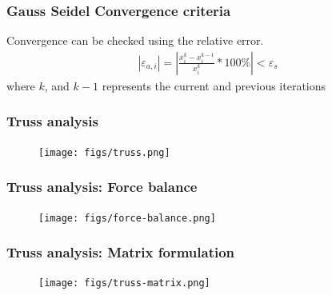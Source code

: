\documentclass[notes]{beamer}
\begin{document}
\begin{frame}
	\frametitle{Gauss Seidel Convergence criteria}
	Convergence can be checked using the relative error.
	\begin{align*}
	\left|\varepsilon_{a, i}\right| = \left|\frac{x_i^k - x_i^{k-1}}{x_i^k}*100\% \right|< \varepsilon_s
	\end{align*}
	where $k$, and $k-1$ represents the current and previous iterations
\end{frame}


\begin{frame}
	\frametitle{Truss analysis}
	\begin{figure}[ht]
		\centering
		\texttt{[image: figs/truss.png]}
	\end{figure}
\end{frame}

\begin{frame}
	\frametitle{Truss analysis: Force balance}
	\begin{figure}[ht]
		\centering
		\texttt{[image: figs/force-balance.png]}
	\end{figure}
\end{frame}

\begin{frame}
	\frametitle{Truss analysis: Matrix formulation}
	\begin{figure}[ht]
		\centering
		\texttt{[image: figs/truss-matrix.png]}
	\end{figure}
\end{frame}
\end{document}
